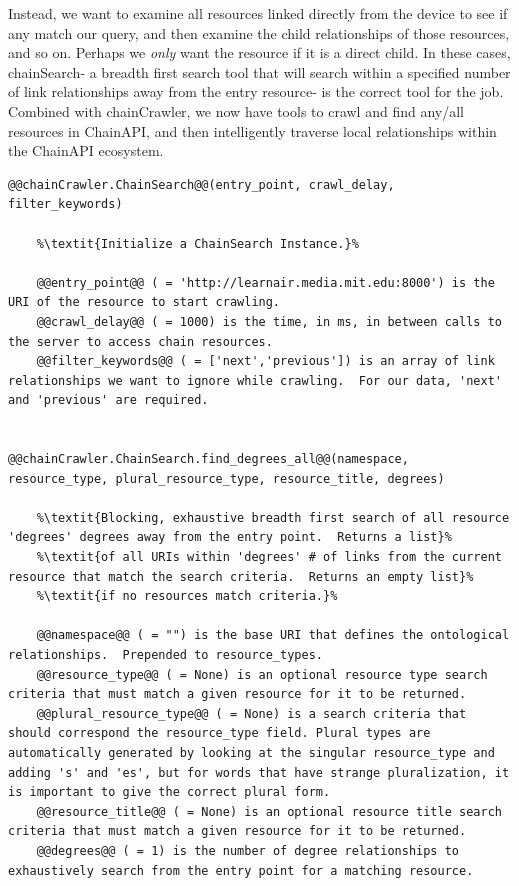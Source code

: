 Instead, we want to examine all resources linked directly from the device to see if any match our query, and then examine the child relationships of those resources, and so on.  Perhaps we \textit{only} want the resource if it is a direct child.  In these cases, chainSearch- a breadth first search tool that will search within a specified number of link relationships away from the entry resource- is the correct tool for the job.  Combined with chainCrawler, we now have tools to crawl and find any/all resources in ChainAPI, and then intelligently traverse local relationships within the ChainAPI ecosystem.      


\begin{lstlisting}[style=codedef]
@@chainCrawler.ChainSearch@@(entry_point, crawl_delay, filter_keywords)
	
	%\textit{Initialize a ChainSearch Instance.}%

	@@entry_point@@ ( = 'http://learnair.media.mit.edu:8000') is the URI of the resource to start crawling.
	@@crawl_delay@@ ( = 1000) is the time, in ms, in between calls to the server to access chain resources.
	@@filter_keywords@@ ( = ['next','previous']) is an array of link relationships we want to ignore while crawling.  For our data, 'next' and 'previous' are required.


@@chainCrawler.ChainSearch.find_degrees_all@@(namespace, resource_type, plural_resource_type, resource_title, degrees)
	
	%\textit{Blocking, exhaustive breadth first search of all resource 'degrees' degrees away from the entry point.  Returns a list}%
	%\textit{of all URIs within 'degrees' # of links from the current resource that match the search criteria.  Returns an empty list}%
	%\textit{if no resources match criteria.}%

	@@namespace@@ ( = "") is the base URI that defines the ontological relationships.  Prepended to resource_types. 
	@@resource_type@@ ( = None) is an optional resource type search criteria that must match a given resource for it to be returned.
	@@plural_resource_type@@ ( = None) is a search criteria that should correspond the resource_type field. Plural types are automatically generated by looking at the singular resource_type and adding 's' and 'es', but for words that have strange pluralization, it is important to give the correct plural form. 
	@@resource_title@@ ( = None) is an optional resource title search criteria that must match a given resource for it to be returned.
	@@degrees@@ ( = 1) is the number of degree relationships to exhaustively search from the entry point for a matching resource.



\end{lstlisting}
